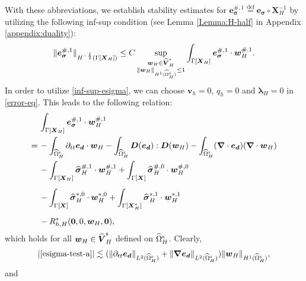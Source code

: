 \documentclass[11pt,reqno]{amsart}
\theoremstyle{definition}
\theoremstyle{plain}
\numberwithin{theorem}{section}
\numberwithin{proposition}{section}
\numberwithin{lemma}{section}
\numberwithin{equation}{section}
\newcommand{\bs}[1]{\boldsymbol{#1}}
\newcommand{\uu}[1]  {{\bs{#1}} }
\newcommand{\dep}{{{\bs{d}}}}
\newcommand{\grad}   { \uu{\nabla}    }
\newcommand{\bw}{{\bs w}}
\renewcommand{\(}{\bigl(}
\renewcommand{\)}{\bigr)}
\def\eqd{\stackrel{\mathrm{def}}{=}}
\begin{document}
With these abbreviations, we establish stability estimates for ${\bs e}_{\bs\sigma}^{\#,1}\eqd{\bs e}_{\bs\sigma}\circ{\bs X}_H^{-1}$ by utilizing the following inf-sup condition (see Lemma \ref{Lemma:H-half} in Appendix \ref{appendix:duality}):  
\begin{align}
\| {\bs e}_{\bs\sigma}^{\#,1} \|_{H^{-\frac12}(\Gamma[{\bs X}_H])} 
\le C\sup_{{\substack{{\bs w}_H\in  \widehat{\bs V}_H^{\rm s}  \\ \|{\bs w}_H\|_{H^1(\widehat{\Omega}^{\rm s}_H)} \le 1}}} 
\int_{\Gamma[{\bs X}_H]} {\bs e}_{\bs\sigma}^{\#,1} \cdot {\bs w}_H^{\#,1} . \label{inf-sup-esigma} 
\end{align}
In order to utilize \eqref{inf-sup-esigma}, we can choose ${\bs v}_h=0$, $q_h=0$ and ${\bs\lambda}_H=0$ in \eqref{error-eq}. This leads to the following relation:
\begin{subequations}\label{esigma-test}
\begin{align}
&\int_{\Gamma[\bs X_H]} {\bs e}_{\bs\sigma}^{\#,1} \cdot \bw_H^{\#,1} \notag\\  
=\, & -\int_{\widehat{\Omega}^{\rm s}_H} \partial_{tt}{\bs e}_{\dep} \cdot \bw_H 
- \int_{\widehat{\Omega}^{\rm s}_H} {\bs D}({\bs e}_\dep):{\bs D}(\bw_H) - \int_{\widehat{\Omega}^{\rm s}_H} (\grad\cdot{\bs e}_\dep) (\grad\cdot \bw_H) \label{esigma-test-a}\\ 
& - \int_{\Gamma[\bs X_H]} {\widehat{\bs\sigma}}_H^{\#,1}\cdot \bw_H^{\#,1} + \int_{\Gamma[\bs X]} {\widehat{\bs\sigma}}_H^{\#,0} \cdot \bw_H^{\#,0}  \label{esigma-test-b}\\[5pt]
& - \int_{\Gamma[\bs X]} {\widehat{\bs\sigma}}_H^{*,0} \cdot \bw_H^{*,0} + \int_{\Gamma[\bs X_H^*]} {\widehat{\bs\sigma}}_H^{*,1} \cdot \bw_H^{*,1}  \label{esigma-test-c}\\[5pt] 
& - R_{h,H}^*(\bs 0,  0, \bs w_H, \bs 0) , \label{esigma-test-d} 
\end{align}
\end{subequations}
which holds for all ${\bs w}_H\in \widehat{\bs V}^{\rm s}_H$ defined on $\widehat\Omega^{\rm s}_H$. 
Clearly, 
\begin{align}
|\eqref{esigma-test-a}|\lesssim (\|\partial_{tt}{\bs e}_{\dep}\|_{L^2(\widehat{\Omega}^{\rm s}_H)} + \|\grad {\bs  e}_\dep\|_{L^2(\widehat{\Omega}^{\rm s}_H)}) \|{\bs w}_H\|_{H^1(\widehat\Omega^{\rm s}_H)} , 
\end{align}
and
\end{document}
